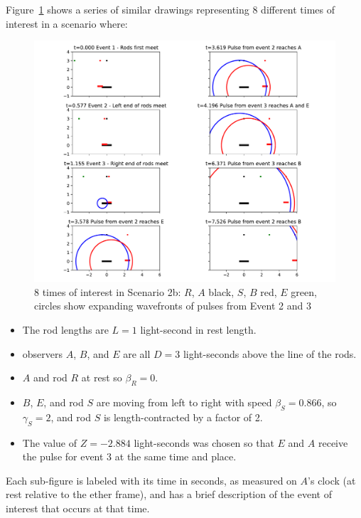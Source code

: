 \documentclass[a4paper]{article}
\theoremstyle{plain}
\theoremstyle{definition}
\begin{document}
Figure~\ref{fig:eight-times-of-interest-in-scenario-2b} shows a series
of similar drawings representing 8 different times of interest in a
scenario where:
\begin{figure}[h!]
	\centering
	\includegraphics[width=1.0\textwidth]{scen2b-L-1.0-D-3.0-beta_S-0.866-cropped.pdf}
	\caption{8 times of interest in Scenario 2b: $R$, $A$ black, $S$, $B$ red, $E$ green, circles show expanding wavefronts of pulses from Event 2 and 3}
	\label{fig:eight-times-of-interest-in-scenario-2b}
\end{figure}
\begin{itemize}
\item The rod lengths are $L=1$ light-second in rest length.
\item observers $A$, $B$, and $E$ are all $D=3$ light-seconds above
  the line of the rods.
\item $A$ and rod $R$ at rest so $\beta_R=0$.
\item $B$, $E$, and rod $S$ are moving from left to right with speed
  $\beta_S=0.866$, so $\gamma_S=2$, and rod $S$ is length-contracted
  by a factor of 2.
\item The value of $Z=-2.884$ light-seconds was chosen so that $E$ and
  $A$ receive the pulse for event 3 at the same time and place.
\end{itemize}
Each sub-figure is labeled with its time in seconds, as measured on
$A$'s clock (at rest relative to the ether frame), and has a brief
description of the event of interest that occurs at that time.
\end{document}
